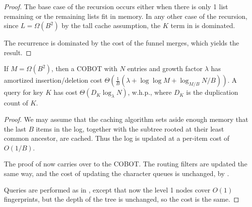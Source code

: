 
\begin{proof}
	The base case of the recursion occurs either when there is only 1 list
	remaining or the remaining lists fit in memory. In any other case of the
	recursion, since $L=\Omega(B^2)$ by the tall cache assumption, the $K$ term
	in  is dominated.

	The recurrence is dominated by the cost of the funnel merges, which yields
	the result.
\end{proof}

\begin{theorem}
	If $M=\Omega(B^2)$, then a COBOT with $N$ entries and growth factor
	$\lambda$ has amortized insertion/deletion cost
	$\Theta\left(\frac{1}{B}\left(\lambda + \log\log M + \log_{M/B}
	N/B\right)\right)$. A query for key $K$ has cost
	$\Theta\left(D_K\log_\lambda N\right)$, w.h.p., where $D_K$ is the
	duplication count of $K$.
\end{theorem}

\begin{proof}
	We may assume that the caching algorithm sets aside enough memory that the
	last $B$ items in the log, together with the subtree rooted at their least
	common ancestor, are cached. Thus the log is updated at a per-item cost of
	$O(1/B)$.

        The proof of  now carries over to the COBOT. The
        routing filters are updated the same way, and the cost of updating the
        character queues is unchanged, by .

	Queries are performed as in , except that now
	the level 1 nodes cover $O(1)$ fingerprints, but the depth of the tree is
	unchanged, so the cost is the same.
\end{proof}
